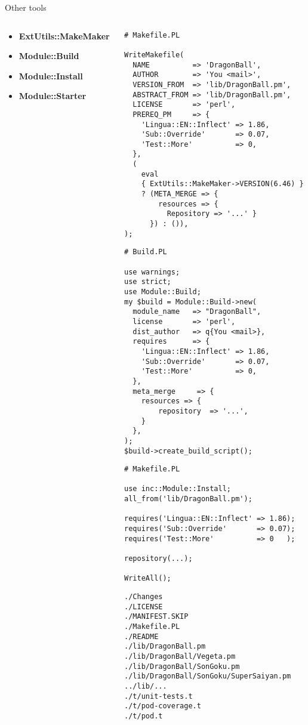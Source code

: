 \documentclass[serif,14pt,color=usenames,dvipsnames]{beamer}
\begin{document}
\begin{frame}[fragile]{Other tools}
\begin{columns}[t]
\begin{column}{.45\textwidth}
\footnotesize
\begin{itemize}
	\item<1-> \alert<1>{\textbf{ExtUtils::MakeMaker}}
	\item<3-> \alert<3>{\textbf{Module::Build}}
	\item<4-> \alert<4>{\textbf{Module::Install}}
	\item<5-> \alert<5>{\textbf{Module::Starter}}
\end{itemize}
\end{column}
\begin{column}{.78\textwidth}
\begin{overprint}
\begin{verbatim}
# Makefile.PL

WriteMakefile(
  NAME          => 'DragonBall',
  AUTHOR        => 'You <mail>',
  VERSION_FROM  => 'lib/DragonBall.pm',
  ABSTRACT_FROM => 'lib/DragonBall.pm',
  LICENSE       => 'perl',
  PREREQ_PM     => {
    'Lingua::EN::Inflect' => 1.86,
    'Sub::Override'       => 0.07,
    'Test::More'          => 0,
  },
  (
    eval
    { ExtUtils::MakeMaker->VERSION(6.46) }
    ? (META_MERGE => {
        resources => {
          Repository => '...' }
      }) : ()),
);
\end{verbatim}
\begin{verbatim}
# Build.PL

use warnings;
use strict;
use Module::Build;
my $build = Module::Build->new(
  module_name   => "DragonBall",
  license       => 'perl',
  dist_author   => q{You <mail>},
  requires      => {
    'Lingua::EN::Inflect' => 1.86,
    'Sub::Override'       => 0.07,
    'Test::More'          => 0,
  },
  meta_merge     => {
    resources => {
        repository  => '...',
    }
  },
);
$build->create_build_script();
\end{verbatim}
\begin{verbatim}
# Makefile.PL

use inc::Module::Install;
all_from('lib/DragonBall.pm');

requires('Lingua::EN::Inflect' => 1.86);
requires('Sub::Override'       => 0.07);
requires('Test::More'          => 0   );

repository(...);

WriteAll();
\end{verbatim}
\begin{verbatim}
./Changes
./LICENSE
./MANIFEST.SKIP
./Makefile.PL
./README
./lib/DragonBall.pm
./lib/DragonBall/Vegeta.pm
./lib/DragonBall/SonGoku.pm
./lib/DragonBall/SonGoku/SuperSaiyan.pm
../lib/...
./t/unit-tests.t
./t/pod-coverage.t
./t/pod.t
\end{verbatim}
\end{overprint}
\end{column}
\end{columns}
\end{frame}
\end{document}
